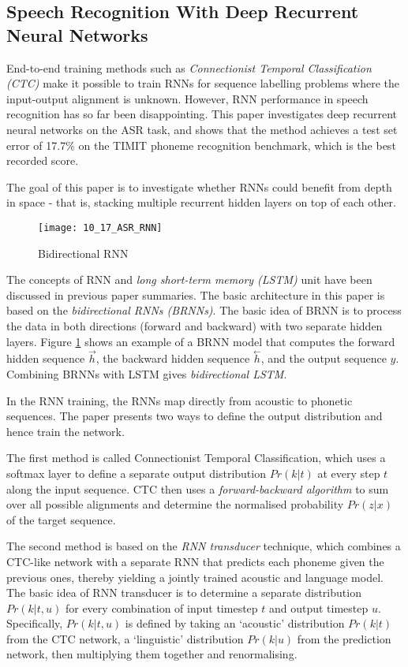 \subsection{Speech Recognition With Deep Recurrent Neural Networks \cite{Graves2013Speech}}

End-to-end training methods such as \emph{Connectionist Temporal Classification (CTC)} make it possible to train RNNs for sequence labelling problems where the input-output alignment is unknown. However, RNN performance in speech recognition has so far been disappointing. This paper investigates deep recurrent neural networks on the ASR task, and shows that the method achieves a test set error of 17.7\% on the TIMIT phoneme recognition benchmark, which is the best recorded score.

The goal of this paper is to investigate whether RNNs could benefit from depth in space - that is, stacking multiple recurrent hidden layers on top of each other.

\begin{figure}[htbp]
  \centering
  \texttt{[image: 10\_17\_ASR\_RNN]}\\
  \caption{Bidirectional RNN}\label{fig:ASR_RNN}
\end{figure}

The concepts of RNN and \emph{long short-term memory (LSTM)} unit have been discussed in previous paper summaries. The basic architecture in this paper is based on the \emph{bidirectional RNNs (BRNNs)}. The basic idea of BRNN is to process the data in both directions (forward and backward) with two separate hidden layers. Figure \ref{fig:ASR_RNN} shows an example of a BRNN model that computes the forward hidden sequence $\stackrel{\rightarrow}{h}$, the backward hidden sequence $\stackrel{\leftarrow}{h}$, and the output sequence $y$. Combining BRNNs with LSTM gives \emph{bidirectional LSTM}.

In the RNN training, the RNNs map directly from acoustic to phonetic sequences. The paper presents two ways to define the output distribution and hence train the network.

The first method is called Connectionist Temporal Classification, which uses a softmax layer to define a separate output distribution $Pr(k|t)$ at every step $t$ along the input sequence. CTC then uses a \emph{forward-backward algorithm} to sum over all possible alignments and determine the normalised probability $Pr(z|x)$ of the target sequence.

The second method is based on the \emph{RNN transducer} technique, which combines a CTC-like network with a separate RNN that predicts each phoneme given the previous ones, thereby yielding a jointly trained acoustic and language model. The basic idea of RNN transducer is to determine a separate distribution $Pr(k | t, u)$ for every combination of input timestep $t$ and output timestep $u$. Specifically, $Pr(k | t, u)$ is defined by taking an `acoustic' distribution $Pr(k | t)$ from the CTC network, a `linguistic' distribution $Pr(k | u)$ from the prediction network, then multiplying them together and renormalising.

